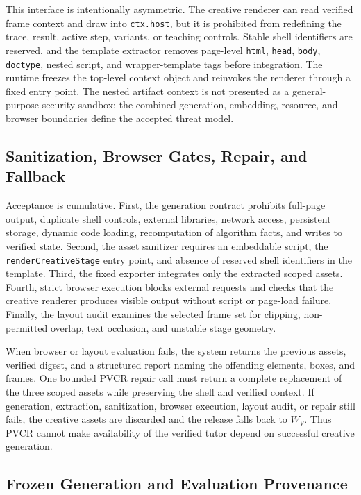 \documentclass[letterpaper]{article}
\newcommand{\pvcr}{\textsc{PVCR}}
\begin{document}
This interface is intentionally asymmetric. The creative renderer can read verified frame context and draw into \texttt{ctx.host}, but it is prohibited from redefining the trace, result, active step, variants, or teaching controls. Stable shell identifiers are reserved, and the template extractor removes page-level \texttt{html}, \texttt{head}, \texttt{body}, \texttt{doctype}, nested script, and wrapper-template tags before integration. The runtime freezes the top-level context object and reinvokes the renderer through a fixed entry point. The nested artifact context is not presented as a general-purpose security sandbox; the combined generation, embedding, resource, and browser boundaries define the accepted threat model.

\subsection{Sanitization, Browser Gates, Repair, and Fallback}

Acceptance is cumulative. First, the generation contract prohibits full-page output, duplicate shell controls, external libraries, network access, persistent storage, dynamic code loading, recomputation of algorithm facts, and writes to verified state. Second, the asset sanitizer requires an embeddable script, the \texttt{renderCreativeStage} entry point, and absence of reserved shell identifiers in the template. Third, the fixed exporter integrates only the extracted scoped assets. Fourth, strict browser execution blocks external requests and checks that the creative renderer produces visible output without script or page-load failure. Finally, the layout audit examines the selected frame set for clipping, non-permitted overlap, text occlusion, and unstable stage geometry.

When browser or layout evaluation fails, the system returns the previous assets, verified digest, and a structured report naming the offending elements, boxes, and frames. One bounded \pvcr{} repair call must return a complete replacement of the three scoped assets while preserving the shell and verified context. If generation, extraction, sanitization, browser execution, layout audit, or repair still fails, the creative assets are discarded and the release falls back to $W_V$. Thus \pvcr{} cannot make availability of the verified tutor depend on successful creative generation.

\subsection{Frozen Generation and Evaluation Provenance}
\end{document}

